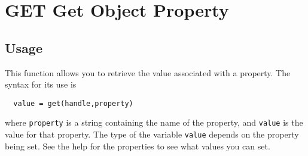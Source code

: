 \section{GET Get Object Property}

\subsection{Usage}

This function allows you to retrieve the value associated
with a property.  The syntax for its use is
\begin{verbatim}
  value = get(handle,property)
\end{verbatim}
where \verb|property| is a string containing the name of the
property, and \verb|value| is the value for that property. The
type of the variable \verb|value| depends on the property being
set.  See the help for the properties to see what values
you can set.
